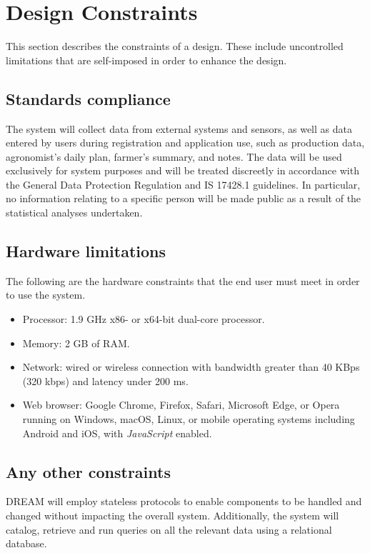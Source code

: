 \section{Design Constraints}

This section describes the constraints of a design. These include uncontrolled limitations that are self-imposed in order to enhance the design.

\subsection{Standards compliance}

The system will collect data from external systems and sensors, as well as data entered by users during registration and application use, such as production data, agronomist's daily plan, farmer's summary, and notes. The data will be used exclusively for system purposes and will be treated discreetly in accordance with the General Data Protection Regulation \cite{GDPR} and IS 17428.1 \cite{india_privacy_doc} guidelines. In particular, no information relating to a specific person will be made public as a result of the statistical analyses undertaken.

\subsection{Hardware limitations}

The following are the hardware constraints that the end user must meet in order to use the system.

\begin{itemize}
    \item Processor: 1.9 GHz x86- or x64-bit dual-core processor.
    \item Memory: 2 GB of RAM.
    \item Network: wired or wireless connection with bandwidth greater than 40 KBps (320 kbps) and latency under 200 ms.
    \item Web browser: Google Chrome, Firefox, Safari, Microsoft Edge, or Opera running on Windows, macOS, Linux, or mobile operating systems including Android and iOS, with \textit{JavaScript} enabled.
\end{itemize}

\subsection{Any other constraints}

DREAM will employ stateless protocols to enable components to be handled and changed without impacting the overall system. Additionally, the system will catalog, retrieve and run queries on all the relevant data using a relational database.

